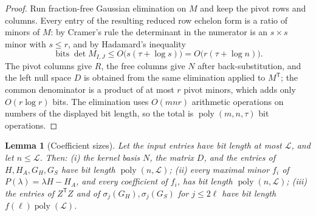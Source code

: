 \documentclass[journal]{IEEEtran}
\theoremstyle{plainn}
\newtheorem{lem}[thm]{Lemma}
\theoremstyle{remark}
\begin{document}
\begin{proof}
Run fraction-free Gaussian elimination on $M$ and keep the pivot rows and columns. Every entry of the
resulting reduced row echelon form is a ratio of minors of $M$: by Cramer's rule the determinant in
the numerator is an $s\times s$ minor with $s\le r$, and by Hadamard's inequality
\begin{equation*}
\operatorname{bits}\det M_{I,J}\le O\bigl(s(\tau+\log s)\bigr)=O\bigl(r(\tau+\log n)\bigr).
\end{equation*}
The pivot columns give $R$, the free columns give $N$ after back-substitution, and the left null
space $D$ is obtained from the same elimination applied to $M^{\mathsf T}$; the common denominator
is a product of at most $r$ pivot minors, which adds only $O(r\log r)$ bits. The elimination uses
$O(mnr)$ arithmetic operations on numbers of the displayed bit length, so the total is
$\operatorname{poly}(m,n,\tau)$ bit operations.
\end{proof}

\begin{lem}[Coefficient sizes]\label{lem:coeff}
Let the input entries have bit length at most $\mathcal L$, and let
$n\le\mathcal L$. Then:
\emph{(i)} the kernel basis $N$, the matrix $D$, and the entries of
$H,H_A,G_H,G_S$ have bit length $\operatorname{poly}(n,\mathcal L)$;
\emph{(ii)} every maximal minor $f_i$ of $P(\lambda)=\lambda H-H_A$, and every
coefficient of $f_i$, has bit length $\operatorname{poly}(n,\mathcal L)$;
\emph{(iii)} the entries of $Z^{\mathsf T}Z$ and of $\sigma_j(G_H),\sigma_j(G_S)$ for
$j\le2\ell$ have bit length $f(\ell)\operatorname{poly}(\mathcal L)$.
\end{lem}
\end{document}
